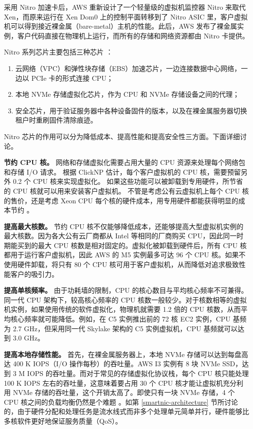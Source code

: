 采用 Nitro 加速卡后，AWS 重新设计了一个轻量级的虚拟机监控器 Nitro 来取代 Xen，而原来运行在 Xen Dom0 上的控制平面转移到了 Nitro ASIC 里，客户虚拟机可以得到接近裸金属（bare-metal）主机的性能。此后，AWS 发布了裸金属实例，客户代码直接在物理机上运行，而所有的存储和网络资源都由 Nitro 卡提供。

Nitro 系列芯片主要包括三种芯片 \cite{nitro-blog,nitro-talk,nitro-web}：
\begin{enumerate}
	\item 云网络（VPC）和弹性块存储（EBS）加速芯片，一边连接数据中心网络，一边以 PCIe 卡的形式连接 CPU；
	\item 本地 NVMe 存储虚拟化芯片，作为 CPU 和 NVMe 存储设备之间的代理；
	\item 安全芯片，用于验证服务器中各种设备固件的版本，以及在裸金属服务器切换租户时重刷固件清除痕迹。
\end{enumerate}

Nitro 芯片的作用可以分为降低成本、提高性能和提高安全性三方面。下面详细讨论。

\textbf{节约 CPU 核。}
网络和存储虚拟化需要占用大量的 CPU 资源来处理每个网络包和存储 I/O 请求。
根据 ClickNP \cite{li2016clicknp} 估计，每个客户虚拟机的 CPU 核，需要预留另外 0.2 个 CPU 核来实现虚拟化。
如果这些功能可以被卸载到专用硬件，所节省的 CPU 核就可以用来安装客户虚拟机。
不管是考虑公有云虚拟机上每个 CPU 核的售价，还是考虑 Xeon CPU 每个核的硬件成本，用专用硬件都能获得明显的成本节约 \cite{smartnic}。

\textbf{提高最大核数。}
节约 CPU 核不仅能够降低成本，还能够提高大型虚拟机实例的最大核数。因为各大公有云厂商都从 Intel 等相同的厂商购买 CPU，因此同一时期能买到的最大 CPU 核数是相对固定的。虚拟化被卸载到硬件后，所有 CPU 核都用于运行客户虚拟机，因此 AWS 的 M5 实例最多可达 96 个 CPU 核。如果不使用硬件卸载，将只有 80 个 CPU 核可用于客户虚拟机，从而降低对追求极致性能客户的吸引力。

\textbf{提高单核频率。}
由于功耗墙的限制，CPU 的核心数目与平均核心频率不可兼得。同一代 CPU 架构下，较高核心频率的 CPU 核数一般较少。对于核数相等的虚拟机实例，如果使用传统的软件虚拟化，物理机就需要 1.2 倍的 CPU 核数，从而平均核心频率就可能降低。例如，在 C5 实例推出前的 72 核 EC2 实例，CPU 基频为 2.7 GHz，但采用同一代 Skylake 架构的 C5 实例虚拟机，CPU 基频就可以达到 3.0 GHz。

\textbf{提高本地存储性能。}
首先，在裸金属服务器上，本地 NVMe 存储可以达到每盘高达 400 K IOPS（I/O 操作每秒）的吞吐量。AWS I3 实例有 8 块 NVMe SSD，达到 3 M IOPS 的吞吐量。而对于常见的存储虚拟化协议栈，每个 CPU 核只能处理 100 K IOPS 左右的吞吐量，这意味着要占用 30 个 CPU 核才能让虚拟机充分利用 NVMe 存储的吞吐量，这个开销太高了。即使只有一块 NVMe 存储，4 个 CPU 核之间的负载均衡仍然是个难题 \cite{li2017kv}。如第 \ref{smartnic-architecture} 节所讨论的，由于硬件分配和处理任务是流水线式而非多个处理单元简单并行，硬件能够比多核软件更好地保证服务质量（QoS）。

